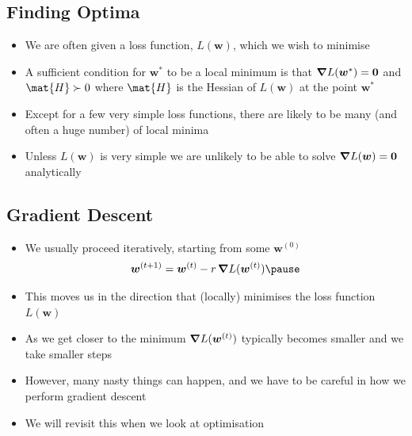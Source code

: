 
\begin{slide}
\section{Finding Optima}

\begin{PauseHighLight}
  \begin{itemize}
  \item We are often given a loss function, $L(\bm{w})$, which we wish
    to minimise\pause
  \item A sufficient condition for $\bm{w}^*$ to be a local minimum is that $\bm{\nabla}
    L(\bm{w}^*)=\bm{0}$\pause{} and $\mat{H}\succ0$ where $\mat{H}$ is the
    Hessian of $L(\bm{w})$ at the point $\bm{w}^*$\pauseb
  \item Except for a few very simple loss functions, there are likely
    to be many (and often a huge number) of local minima\pause
  \item Unless $L(\bm{w})$ is very simple we are unlikely to be able
    to solve $\bm{\nabla} L(\bm{w})=\bm{0}$ analytically\pause
  \end{itemize}
\end{PauseHighLight}

\end{slide}


\begin{slide}
\section{Gradient Descent}

\begin{PauseHighLight}
  \begin{itemize}
  \item We usually proceed iteratively, starting from some $\bm{w}^{(0)}$
    \begin{align*}
      \bm{w}^{(t+1)} = \bm{w}^{(t)} - r\, \grad L(\bm{w}^{(t)})\pause
    \end{align*}
  \item This moves us in the direction that (locally) minimises the
    loss function $L(\bm{w})$\pause
  \item As we get closer to the minimum $\bm{\nabla} L(\bm{w}^{(t)})$
    typically becomes smaller and we take smaller steps\pause
  \item However, many nasty things can happen, and we have to be
    careful in how we perform gradient descent\pause
  \item We will revisit this when we look at optimisation\pause
  \end{itemize}
\end{PauseHighLight}

\end{slide}

